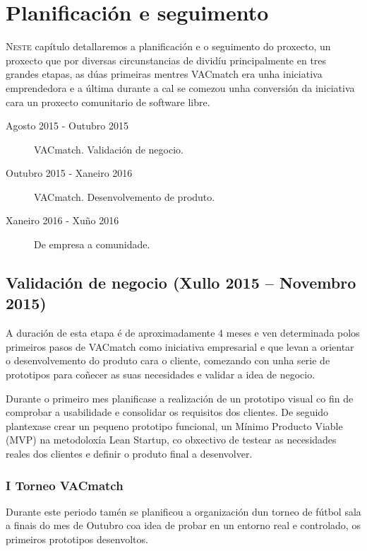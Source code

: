 \chapter{Planificación e seguimento}
\minitoc


  \lettrine{N}{este} capítulo detallaremos a planificación e o seguimento 
do proxecto, un proxecto que por diversas circunstancias de dividíu 
principalmente en tres grandes etapas, as dúas primeiras mentres VACmatch era 
unha iniciativa emprendedora e a última durante a cal se comezou unha conversión 
da iniciativa cara un proxecto comunitario de software libre.

  \begin{description}
    \item [Agosto 2015 - Outubro 2015] VACmatch. Validación de negocio.
    \item [Outubro 2015 - Xaneiro 2016] VACmatch. Desenvolvemento de produto.
    \item [Xaneiro 2016 - Xuño 2016] De empresa a comunidade.
  \end{description}


  \section{Validación de negocio (Xullo 2015 -- Novembro 2015)}
  A duración de esta etapa é de aproximadamente 4 meses e ven determinada polos 
primeiros pasos de VACmatch como iniciativa empresarial e que levan a orientar 
o desenvolvemento do produto cara o cliente, comezando con unha serie de 
prototipos para coñecer as suas necesidades e validar a idea de 
negocio.

  Durante o primeiro mes planificase a realización de un prototipo visual co 
fin de comprobar a usabilidade e consolidar os requisitos dos clientes.
  De seguido plantexase crear un pequeno prototipo funcional, un Mínimo 
Producto Viable (MVP) na metodoloxía Lean Startup, co obxectivo de testear as 
necesidades reales dos clientes e definir o produto final a desenvolver.

    \subsection{I Torneo VACmatch}
    Durante este periodo tamén se planificou a organización dun torneo de 
fútbol sala a finais do mes de Outubro coa idea de probar en un entorno real 
e controlado, os primeiros prototipos desenvoltos.

